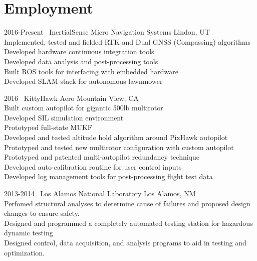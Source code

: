 

\section{Employment}

\begin{entrylist}
\entry
{2016-Present}
{\inertialsense~InertialSense Micro Navigation Systems}
{Lindon, UT}
{ \\
	Implemented, tested and fielded RTK and Dual GNSS (Compassing) algorithms \\
	Developed hardware continuous integration tools \\
	Developed data analysis and post-processing tools \\
	Built ROS tools for interfacing with embedded hardware \\
	Developed SLAM stack for autonomous lawnmower
}
{\vspace{-0.3cm}}
\end{entrylist}

\begin{entrylist}
\entry
{2016}
{\kittyhawk~KittyHawk Aero}
{Mountain View, CA}
{ \\
	Built custom autopilot for gigantic 500lb multirotor \\
	Developed SIL simulation environment \\
	Prototyped full-state MUKF \\
	Developed and tested altitude hold algorithm around PixHawk autopilot\\
	Prototyped and tested new multirotor configuration with custom autopilot \\
	Prototyped and patented multi-autopilot redundancy technique \\
	Developed auto-calibration routine for user control inputs \\
	Developed log management tools for post-processing flight test data
}
{\vspace{-0.3cm}}
\end{entrylist}

\begin{entrylist}
\entry
{2013-2014}
{\losalamos~Los Alamos National Laboratory}
{Los Alamos, NM}
{ \\
	Perfomed structural analyses to determine cause of failures and proposed design changes to ensure safety. \\
	Designed and programmed a completely automated testing station for hazardous dynamic testing\\
	Designed control, data acquisition, and analysis programs to aid in testing and optimization. \\
}
{\vspace{-0.3cm}}
\end{entrylist}

